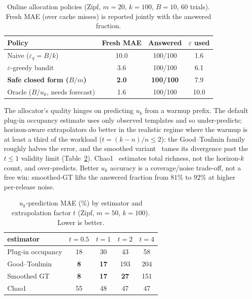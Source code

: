 \documentclass[sigconf,nonacm]{acmart}
\newcommand{\eps}{\varepsilon}
\begin{document}
\begin{table}[h]
\footnotesize\centering
\caption{Online allocation policies (Zipf, $m{=}20$, $k{=}100$, $B{=}10$, 60 trials). Fresh MAE (over cache misses) is reported jointly with the answered fraction.}
\label{tab:allocation}
\begin{tabular}{l|ccc}
\toprule
Policy & Fresh MAE & Answered & $\eps$ used \\
\midrule
Naive ($\eps_q{=}B/k$)              & 10.0 & 100/100 & 1.6 \\
$\eps$-greedy bandit                & 3.6  & 100/100 & 6.1 \\
\textbf{Safe closed form ($B/m$)}   & \textbf{2.0} & \textbf{100/100} & 7.9 \\
Oracle ($B/u_k$, needs forecast)    & 1.6  & 100/100 & 10.0 \\
\bottomrule
\end{tabular}
\end{table}

\noindent The allocator's quality hinges on predicting $u_k$ from a warmup prefix. The default plug-in occupancy estimate uses only observed templates and so under-predicts; horizon-aware extrapolators do better in the realistic regime where the warmup is at least a third of the workload ($t=(k{-}n)/n\le2$): the Good--Toulmin family roughly halves the error, and the smoothed variant~\cite{orlitsky2016unseen} tames its divergence past the $t\le1$ validity limit (Table~\ref{tab:predictors}). Chao1~\cite{chao1984} estimates total richness, not the horizon-$k$ count, and over-predicts. Better $u_k$ accuracy is a coverage/noise trade-off, not a free win: smoothed-GT lifts the answered fraction from $81\%$ to $92\%$ at higher per-release noise.

\begin{table}[h]
\footnotesize\centering
\caption{$u_k$-prediction MAE (\%) by estimator and extrapolation factor $t$ (Zipf, $m{=}50$, $k{=}100$). Lower is better.}
\label{tab:predictors}
\begin{tabular}{l|cccc}
\toprule
estimator & $t{=}0.5$ & $t{=}1$ & $t{=}2$ & $t{=}4$ \\
\midrule
Plug-in occupancy        & 18 & 30 & 43 & 58 \\
Good--Toulmin~\cite{goodtoulmin1956} & \textbf{8} & \textbf{17} & 193 & 204 \\
Smoothed GT~\cite{orlitsky2016unseen} & \textbf{8} & \textbf{17} & \textbf{27} & 151 \\
Chao1~\cite{chao1984}    & 55 & 48 & 47 & 47 \\
\bottomrule
\end{tabular}
\end{table}
\end{document}
